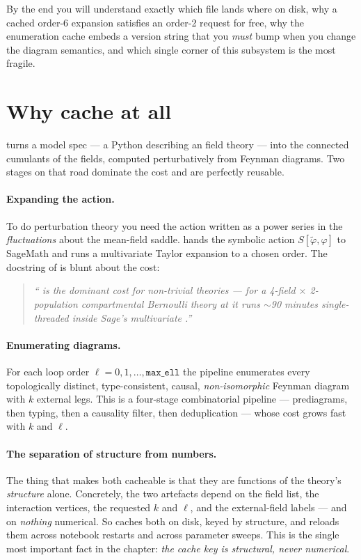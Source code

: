 By the end you will understand exactly which file lands where on disk, why a
cached order-6 expansion satisfies an order-2 request for free, why the
enumeration cache embeds a version string that you \emph{must} bump when you
change the diagram semantics, and which single corner of this subsystem is the
most fragile.

\section{Why cache at all}

\Daedalus{} turns a model spec --- a Python  describing an \msrjd{}
field theory --- into the connected cumulants of the fields, computed
perturbatively from Feynman diagrams. Two stages on that road dominate the
cost and are perfectly reusable.

\paragraph{Expanding the action.}
To do perturbation theory you need the action written as a power series in the
\emph{fluctuations} about the mean-field saddle. \Daedalus{} hands the
symbolic \msrjd{} action $S[\tilde\varphi,\varphi]$ to SageMath and runs a
multivariate Taylor expansion to a chosen order. The docstring of
 is blunt about the cost:

\begin{quote}\itshape
`` is the dominant cost for non-trivial theories
--- for a 4-field $\times$ 2-population compartmental Bernoulli theory at
 it runs $\sim$90 minutes single-threaded inside Sage's
multivariate .''
\end{quote}

\paragraph{Enumerating diagrams.}
For each loop order $\ell = 0, 1, \dots, \texttt{max\_ell}$ the pipeline
enumerates every topologically distinct, type-consistent, causal,
\emph{non-isomorphic} Feynman diagram with $k$ external legs. This is a
four-stage combinatorial pipeline --- prediagrams, then typing, then a
causality filter, then deduplication --- whose cost grows fast with $k$ and
$\ell$.

\paragraph{The separation of structure from numbers.}
The thing that makes both cacheable is that they are functions of the theory's
\emph{structure} alone. Concretely, the two artefacts depend on the field
list, the interaction vertices, the requested $k$ and $\ell$, and the
external-field labels --- and on \emph{nothing} numerical. So \Daedalus{}
caches both on disk, keyed by structure, and reloads them across notebook
restarts and across parameter sweeps. This is the single most important fact
in the chapter: \emph{the cache key is structural, never numerical}.


